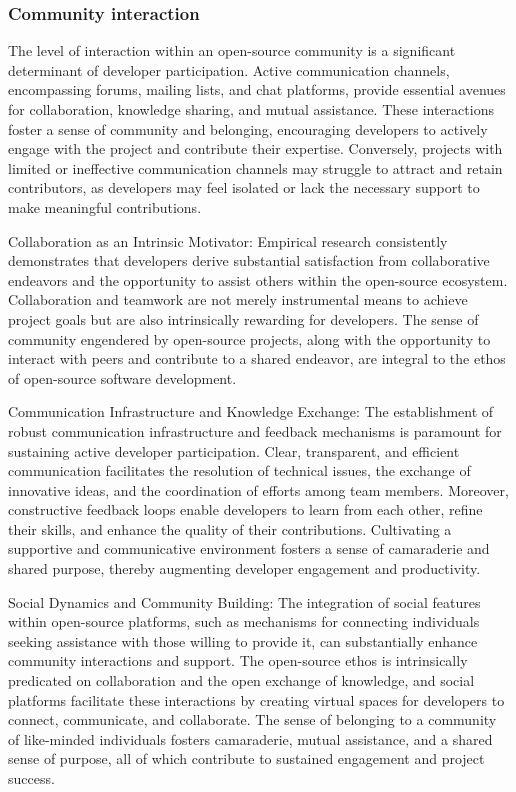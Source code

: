 \subsubsection{Community interaction}
The level of interaction within an open-source community is a significant determinant of developer participation. Active communication channels, encompassing forums, mailing lists, and chat platforms, provide essential avenues for collaboration, knowledge sharing, and mutual assistance. These interactions foster a sense of community and belonging, encouraging developers to actively engage with the project and contribute their expertise. Conversely, projects with limited or ineffective communication channels may struggle to attract and retain contributors, as developers may feel isolated or lack the necessary support to make meaningful contributions.


Collaboration as an Intrinsic Motivator: Empirical research consistently demonstrates that developers derive substantial satisfaction from collaborative endeavors and the opportunity to assist others within the open-source ecosystem. Collaboration and teamwork are not merely instrumental means to achieve project goals but are also intrinsically rewarding for developers. The sense of community engendered by open-source projects, along with the opportunity to interact with peers and contribute to a shared endeavor, are integral to the ethos of open-source software development.

Communication Infrastructure and Knowledge Exchange: The establishment of robust communication infrastructure and feedback mechanisms is paramount for sustaining active developer participation. Clear, transparent, and efficient communication facilitates the resolution of technical issues, the exchange of innovative ideas, and the coordination of efforts among team members. Moreover, constructive feedback loops enable developers to learn from each other, refine their skills, and enhance the quality of their contributions. Cultivating a supportive and communicative environment fosters a sense of camaraderie and shared purpose, thereby augmenting developer engagement and productivity.

Social Dynamics and Community Building: The integration of social features within open-source platforms, such as mechanisms for connecting individuals seeking assistance with those willing to provide it, can substantially enhance community interactions and support. The open-source ethos is intrinsically predicated on collaboration and the open exchange of knowledge, and social platforms facilitate these interactions by creating virtual spaces for developers to connect, communicate, and collaborate. The sense of belonging to a community of like-minded individuals fosters camaraderie, mutual assistance, and a shared sense of purpose, all of which contribute to sustained engagement and project success.

